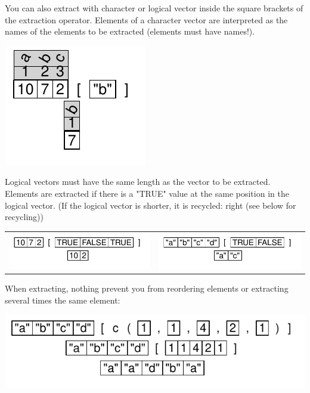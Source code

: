 \documentclass[pdflatex]{article}
\begin{document}
You can also extract with character or logical vector inside the square brackets of the extraction operator. Elements of a character vector are interpreted as the names of the elements to be extracted (elements must have names!).

\includegraphics{extract_char_names}

Logical vectors must have the same length as the vector to be extracted. Elements are extracted if there is a "TRUE" value at the same position in the logical vector. (If the logical vector is shorter, it is recycled: right (see below for recycling))

\begin{tabular}{ll}
\includegraphics{extract_logical} & \includegraphics{extract_logical_recycling}\\
\end{tabular}

When extracting, nothing prevent you from reordering elements or extracting  several times the same element:

\includegraphics{extract_repeating}
\end{document}
